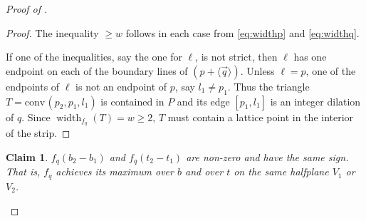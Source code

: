 \documentclass{amsart}
\theoremstyle{plain}
\newtheorem{claim}[theorem]{Claim}
\theoremstyle{definition}
\newcommand{\width}{\operatorname{width}}
\renewcommand{\vec}[1]{\overrightarrow#1}
\newcommand{\vecline}[1]{\langle \vec #1 \rangle}
\newcommand{\conv}{\ensuremath{\mathrm{conv}}\hspace{1pt}}
\begin{document}
\begin{proof}[Proof of ]
\begin{proof}
The inequality $\geq w$ follows in each case from \eqref{eq:widthp} and \eqref{eq:widthq}.

If one of the inequalities, say the one for $\ell$, is not strict, then $\ell$ has one endpoint on each of the boundary lines of $(p + \vecline q)$. Unless $\ell = p$, one of the endpoints of $\ell$ is not an endpoint of $p$, say $l_1 \neq p_1$. Thus the triangle $T=\conv(p_2, p_1, l_1)$ is contained in $P$ and its edge $[p_1, l_1]$ is an integer dilation of $q$. Since $\width_{f_q}(T) =w \geq 2$, $T$ must contain a lattice point in the interior of the strip.
\end{proof}

%



\begin{claim}
\label{claim:b_and_t}
$f_q(b_2-b_1)$ and $f_q(t_2 - t_1)$ are non-zero and have the same sign. That is, $f_q$ achieves its maximum over $b$ and over $t$ on the same halfplane $V_1$ or $V_2$.
\end{claim}



%


\end{proof}
\end{document}
